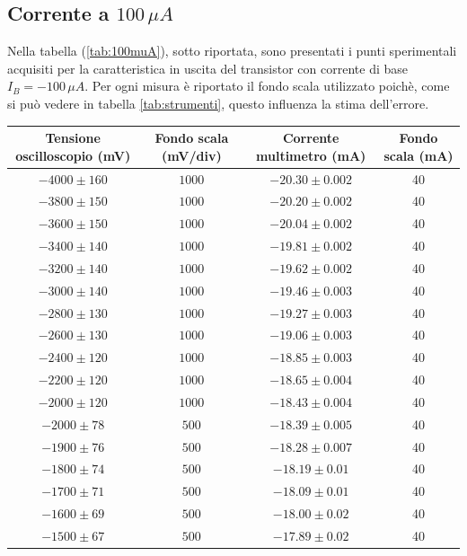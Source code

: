 \documentclass[]{article}
\begin{document}
\subsection{Corrente a $ 100\,\mu A $}
Nella tabella (\ref{tab:100muA}), sotto riportata, sono presentati i punti sperimentali acquisiti per la caratteristica in uscita del transistor con corrente di base $ I_{B}= -100\,\mu A $. Per ogni misura è riportato il fondo scala utilizzato poichè, come si può vedere in tabella \ref{tab:strumenti}, questo influenza la stima dell'errore.
	\begin{table}[H]
		\centering
	\begin{tabular}{|c|c|c|c|}
		\hline
		Tensione oscilloscopio (mV)& Fondo scala (mV/div) & Corrente multimetro (mA) &Fondo scala (mA)\\
		\hline
		$ -4000\pm 160 $ &$ 1000 $ & $ -20.30\pm 0.002 $ &40\\
		\hline
		$-3800\pm150 $ &$ 1000 $ & $ -20.20\pm0.002 $ &40 \\
		\hline
		$ -3600\pm 150 $ &$ 1000 $ & $ -20.04\pm 0.002 $ &40 \\
		\hline
		$ -3400\pm 140 $ &$ 1000 $ & $ -19.81\pm 0.002 $ &40 \\
		\hline
		$ -3200\pm 140 $ &$ 1000 $ & $-19.62\pm 0.002$ &40 \\
		\hline
		$ -3000\pm 140 $ &$ 1000 $ & $ -19.46\pm 0.003 $ &40 \\
		\hline
		$ -2800\pm 130 $ &$ 1000 $ & $ -19.27\pm 0.003 $ &40 \\
		\hline
		$ -2600\pm 130 $ &$ 1000 $ & $ -19.06\pm 0.003 $ &40 \\
		\hline
		$ -2400\pm 120 $ &$ 1000 $ & $ -18.85\pm 0.003 $ &40 \\
		\hline
		$ -2200\pm 120 $ &$ 1000 $ & $ -18.65\pm 0.004 $ &40 \\
		\hline
		$ -2000\pm 120 $ &$ 1000 $ & $ -18.43\pm0.004 $  &40\\
		\hline
		$ -2000\pm 78 $ &$ 500 $ & $ -18.39\pm0.005 $  &40\\
		\hline
		$ -1900\pm 76 $ &$ 500 $ & $ -18.28\pm0.007 $  &40\\
		\hline
		$ -1800\pm 74 $ &$ 500 $ & $ -18.19\pm 0.01 $ &40 \\
		\hline
		$ -1700\pm 71 $ &$ 500 $ & $ -18.09\pm 0.01 $ &40 \\
		\hline
		$ -1600\pm 69 $ &$ 500 $ & $ -18.00\pm 0.02 $ &40 \\
		\hline
		$ -1500\pm 67 $ &$ 500 $ & $ -17.89\pm 0.02 $ &40 \\

\end{tabular}
\end{table}
\end{document}
